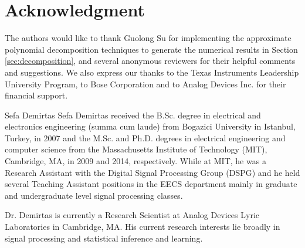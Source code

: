 \documentclass[journal] {IEEEtran}
\begin{document}
\section*{Acknowledgment}


The authors would like to thank Guolong Su for implementing the approximate polynomial decomposition techniques to generate the numerical results in Section \ref{sec:decomposition}, and several anonymous reviewers for their helpful comments and suggestions. We also express our thanks to the Texas Instruments Leadership University Program, to Bose Corporation and to Analog Devices Inc. for their financial support.

\ifCLASSOPTIONcaptionsoff
  \newpage
\fi












{}




\begin{IEEEbiography}{Sefa Demirtas}
Sefa Demirtas received the B.Sc. degree in electrical and electronics engineering (summa cum laude) from Bogazici University in Istanbul, Turkey, in 2007 and the M.Sc. and Ph.D. degrees in electrical engineering and computer science from the Massachusetts Institute of Technology (MIT), Cambridge, MA, in 2009 and 2014, respectively. While at MIT, he was a Research Assistant with the Digital Signal Processing Group (DSPG) and he held several Teaching Assistant positions in the EECS department mainly in graduate and undergraduate level signal processing classes.

Dr. Demirtas is currently a Research Scientist at Analog Devices Lyric Laboratories in Cambridge, MA. His current research interests lie broadly in signal processing and statistical inference and learning.
\end{IEEEbiography}
\end{document}

